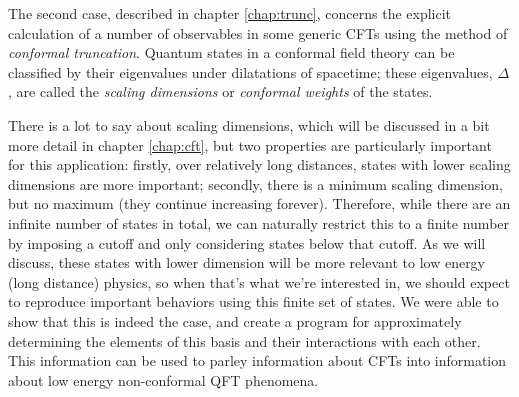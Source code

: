 The second case, described in chapter \ref{chap:trunc}, concerns the explicit 
calculation of a number of observables in some generic CFTs using the method of
\emph{conformal truncation}. Quantum states in a conformal field theory can be
classified by their eigenvalues under dilatations of spacetime; these 
eigenvalues, $\Delta$, are called the \emph{scaling dimensions} or 
\emph{conformal weights} of the states.

There is a lot to say about scaling dimensions, which will be discussed in a bit
more detail in chapter \ref{chap:cft}, but two properties are particularly 
important for this application: firstly, over relatively long distances, states 
with lower scaling dimensions are more important; secondly, there is a minimum 
scaling dimension, but no maximum (they continue increasing forever). Therefore, 
while there are an infinite number of states in total, we can naturally restrict 
this to a finite number by imposing a cutoff and only considering states below 
that cutoff. As we will discuss, these states with lower dimension will be more
relevant to low energy (long distance) physics, so when that's what we're 
interested in, we should expect to reproduce important behaviors using this 
finite set of states. We were able to show that this is indeed the case, and 
create a program for approximately determining the elements of this basis and 
their interactions with each other. This information can be used to parley 
information about CFTs into information about low energy non-conformal QFT 
phenomena.

